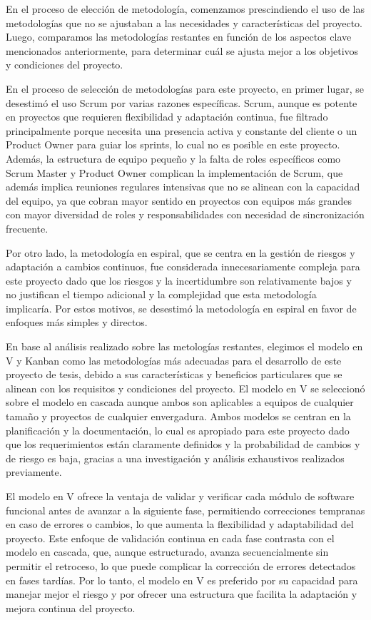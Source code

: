 \documentclass[main.tex]{subfiles}
\begin{document}
En el proceso de elección de metodología, comenzamos prescindiendo el uso de las metodologías que no se ajustaban a las necesidades y características del proyecto. Luego, comparamos las metodologías restantes en función de los aspectos clave mencionados anteriormente, para determinar cuál se ajusta mejor a los objetivos y condiciones del proyecto.

En el proceso de selección de metodologías para este proyecto, en primer lugar, se desestimó el uso Scrum por varias razones específicas. Scrum, aunque es potente en proyectos que requieren flexibilidad y adaptación continua, fue filtrado principalmente porque necesita una presencia activa y constante del cliente o un Product Owner para guiar los sprints, lo cual no es posible en este proyecto. Además, la estructura de equipo pequeño y la falta de roles específicos como Scrum Master y Product Owner complican la implementación de Scrum, que además implica reuniones regulares intensivas que no se alinean con la capacidad del equipo, ya que cobran mayor sentido en proyectos con equipos más grandes con mayor diversidad de roles y responsabilidades con necesidad de sincronización frecuente.

Por otro lado, la metodología en espiral, que se centra en la gestión de riesgos y adaptación a cambios continuos, fue considerada innecesariamente compleja para este proyecto dado que los riesgos y la incertidumbre son relativamente bajos y no justifican el tiempo adicional y la complejidad que esta metodología implicaría. Por estos motivos, se desestimó la metodología en espiral en favor de enfoques más simples y directos.

En base al análisis realizado sobre las metologías restantes, elegimos el modelo en V y Kanban como las metodologías más adecuadas para el desarrollo de este proyecto de tesis, debido a sus características y beneficios particulares que se alinean con los requisitos y condiciones del proyecto. El modelo en V se seleccionó sobre el modelo en cascada aunque ambos son aplicables a equipos de cualquier tamaño y proyectos de cualquier envergadura. Ambos modelos se centran en la planificación y la documentación, lo cual es apropiado para este proyecto dado que los requerimientos están claramente definidos y la probabilidad de cambios y de riesgo es baja, gracias a una investigación y análisis exhaustivos realizados previamente.

El modelo en V ofrece la ventaja de validar y verificar cada módulo de software funcional antes de avanzar a la siguiente fase, permitiendo correcciones tempranas en caso de errores o cambios, lo que aumenta la flexibilidad y adaptabilidad del proyecto. Este enfoque de validación continua en cada fase contrasta con el modelo en cascada, que, aunque estructurado, avanza secuencialmente sin permitir el retroceso, lo que puede complicar la corrección de errores detectados en fases tardías. Por lo tanto, el modelo en V es preferido por su capacidad para manejar mejor el riesgo y por ofrecer una estructura que facilita la adaptación y mejora continua del proyecto.
\end{document}
